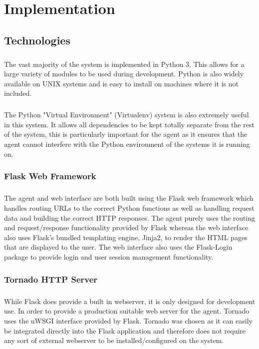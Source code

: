 \documentclass[bsc,logo,twoside,singlespacing,notimes]{infthesis}
\begin{document}
\chapter{Implementation}
\section{Technologies}
\paragraph*{}
	The vast majority of the system is implemented in Python 3.  This allows for a
	large variety of modules to be used during development. Python is also widely
	available on UNIX systems and is easy to install on machines where it is not
	included.

\paragraph*{}
	The Python "Virtual Environment" (Virtualenv) system is also extremely useful
	in this system.  It allows all dependencies to be kept totally separate from
	the rest of the system, this is particularly important for the agent as it
	ensures that the agent cannot interfere with the Python environment of the
	systems it is running on.

\subsection{Flask Web Framework}
\paragraph*{}
	The agent and web interface are both built using the Flask web framework which
	handles routing URLs to the correct Python functions as well as handling
	request data and building the correct HTTP responses. The agent purely uses the
	routing and request/response functionality provided by Flask whereas the web
	interface also uses Flask's bundled templating engine, Jinja2, to render the
	HTML pages that are displayed to the user. The web interface also uses the
	Flask-Login package to provide login and user session management functionality.

\subsection{Tornado HTTP Server}
\paragraph*{}
	While Flask does provide a built in webserver, it is only designed for
	development	use.  In order to provide a production suitable web server for the
	agent.  Tornado uses the uWSGI interface provided by Flask.  Tornado was chosen
	as it can easily be integrated directly into the Flask application and
	therefore does not require any sort of external webserver to be
	installed/configured on the system.
\end{document}
